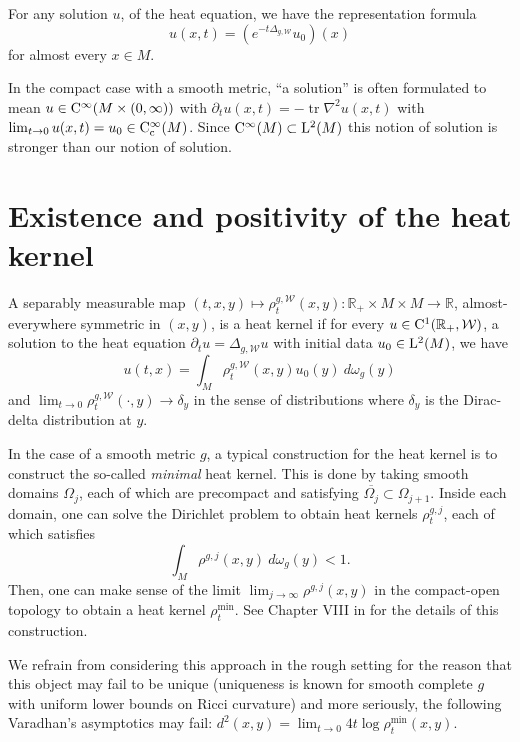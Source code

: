 \documentclass[a4paper, 12pt]{amsart}
\numberwithin{equation}{section}
\renewcommand{\~}{\tilde}
\renewcommand{\-}{\bar}
\newcommand{\R}{\mathbb{R}}
\newcommand{\8}{\infty}
\newcommand{\cW}{\mathcal{W}}
\newcommand{\mdot}{\cdotp}
\newcommand{\close}[1]{\overline{#1}}		%
\DeclareMathOperator{\tr}{tr}			%
\newcommand{\Lp}[2][{}]{{\rm L}^{#2}_{\rm #1}}		%
\newcommand{\Ck}[2][{}]{{\rm C}^{#2}_{\rm #1}}		%
\newcommand{\hk}{\rho}
\begin{document}
For any solution \(u\), of the heat equation, we have the representation formula
\[
u(x,t) = (e^{-t \Delta_{g,\cW}}u_0)(x)
\]
for almost every $x \in M$.
 
\begin{rem}
In the compact case with a smooth metric, ``a solution'' is often formulated to mean $u \in \Ck{\infty}( M \times (0, \infty))$
with $\partial_t u(x,t) = -\tr \nabla^2 u(x,t)$ with 
$\lim_{t \to 0} u(x,t) = u_0 \in \Ck[c]{\infty}(M)$.
Since $\Ck{\infty}(M) \subset \Lp{2}(M)$ this notion of solution is stronger than our notion of solution.
\end{rem}

\section{Existence and positivity of the heat kernel}

\begin{defn}
A separably measurable map $(t,x,y) \mapsto \hk^{g,\cW}_{t}(x,y): \R_+ \times M \times M \to \R$, 
almost-everywhere symmetric in $(x,y)$, is a heat kernel 
if for every $u \in \Ck{1}(\R_+, \cW)$, a solution to the heat equation 
$\partial_t u = \Delta_{g,\cW}u$ with initial data $u_0 \in \Lp{2}(M)$, we have
\[
u(t,x) = \int_{M} \hk^{g,\cW}_t(x,y) u_0(y)\ d\omega_g(y)
\]
and
$\lim_{t \to 0} \hk_t^{g,\cW}(\mdot,y) \to \delta_y$ in the sense of distributions where $\delta_y$ is the Dirac-delta distribution at $y$.
\end{defn}

In the case of a smooth metric $g$, a typical construction for
the heat kernel is to construct the so-called \emph{minimal} heat kernel.
This is done by taking smooth domains $\Omega_j$, 
each of which are precompact and satisfying $\close{\Omega_j} \subset \Omega_{j+1}$. 
Inside each domain, one can solve the Dirichlet problem
to obtain heat kernels $\hk^{g,j}_{t}$, each of which
satisfies 
$$ \int_{M} \hk^{g,j}(x,y)\ d\omega_g(y) < 1.$$
Then, one can make sense of the limit $\lim_{j \to \infty} \hk^{g,j}(x,y)$
in the compact-open topology to obtain a heat kernel $\hk^{\min}_t$.
See Chapter VIII in \cite{Chavel} for the details
of this construction.

We refrain from considering this approach in the rough setting 
for the reason that this object may fail to be unique (uniqueness
is known for smooth complete $g$ with 
uniform lower bounds on Ricci curvature) and more seriously, the following
Varadhan's asymptotics may fail: 
$d^2(x,y) = \lim_{t \to 0} 4t \log \hk^{\min}_t(x,y)$.
\end{document}

